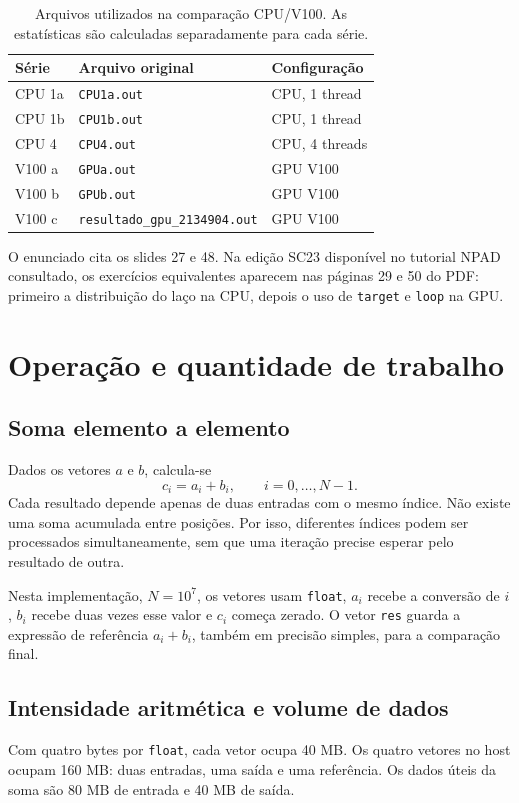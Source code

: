 \documentclass[12pt,a4paper]{article}
\begin{document}
\begin{table}[H]
\centering\small
\begin{tabular}{lp{8cm}l}
\toprule
Série & Arquivo original & Configuração\\
\midrule
CPU 1a & \texttt{CPU1a.out} & CPU, 1 thread\\
CPU 1b & \texttt{CPU1b.out} & CPU, 1 thread\\
CPU 4 & \texttt{CPU4.out} & CPU, 4 threads\\
V100 a & \texttt{GPUa.out} & GPU V100\\
V100 b & \texttt{GPUb.out} & GPU V100\\
V100 c & \texttt{resultado\_gpu\_2134904.out} & GPU V100\\
\bottomrule
\end{tabular}
\caption{Arquivos utilizados na comparação CPU/V100. As estatísticas são calculadas separadamente para cada série.}
\label{tab:selecao}
\end{table}

O enunciado cita os slides 27 e 48. Na edição SC23 disponível no tutorial NPAD consultado, os exercícios equivalentes aparecem nas páginas 29 e 50 do PDF: primeiro a distribuição do laço na CPU, depois o uso de \texttt{target} e \texttt{loop} na GPU.

\section{Operação e quantidade de trabalho}
\subsection{Soma elemento a elemento}
Dados os vetores $a$ e $b$, calcula-se
\[
c_i=a_i+b_i,\qquad i=0,\ldots,N-1.
\]
Cada resultado depende apenas de duas entradas com o mesmo índice. Não existe uma soma acumulada entre posições. Por isso, diferentes índices podem ser processados simultaneamente, sem que uma iteração precise esperar pelo resultado de outra.



Nesta implementação, $N=10^7$, os vetores usam \texttt{float}, $a_i$ recebe a conversão de $i$, $b_i$ recebe duas vezes esse valor e $c_i$ começa zerado. O vetor \texttt{res} guarda a expressão de referência $a_i+b_i$, também em precisão simples, para a comparação final.

\subsection{Intensidade aritmética e volume de dados}
Com quatro bytes por \texttt{float}, cada vetor ocupa 40 MB. Os quatro vetores no host ocupam 160 MB: duas entradas, uma saída e uma referência. Os dados úteis da soma são 80 MB de entrada e 40 MB de saída.
\end{document}
